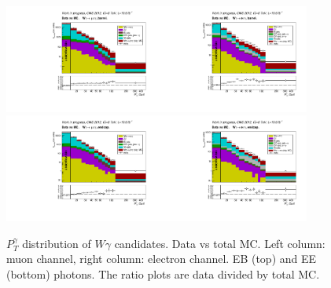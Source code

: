 \begin{figure}[htb]
  \begin{center}
   \includegraphics[width=0.45\textwidth]{../figs/figs_v11/MUON_WGamma/PrepareYields/c_TotalDATAvsMC_Barrel__phoEt.pdf}\includegraphics[width=0.45\textwidth]{../figs/figs_v11/ELECTRON_WGamma/PrepareYields/c_TotalDATAvsMC_Barrel__phoEt.pdf}
   \includegraphics[width=0.45\textwidth]{../figs/figs_v11/MUON_WGamma/PrepareYields/c_TotalDATAvsMC_Endcap__phoEt.pdf}\includegraphics[width=0.45\textwidth]{../figs/figs_v11/ELECTRON_WGamma/PrepareYields/c_TotalDATAvsMC_Endcap__phoEt.pdf}
  \caption{$P_T^{\gamma}$ distribution of $W\gamma$ candidates. Data vs total MC. Left column: muon channel, right column: electron channel. EB (top) and EE (bottom) photons. The ratio plots are data divided by total MC. }
  \label{fig:DATAvsMC}
  \end{center}
\end{figure}
